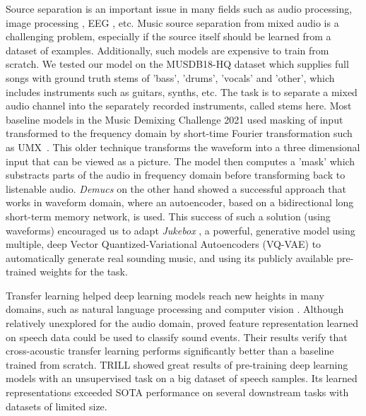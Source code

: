 \documentclass{llncs}
\begin{document}
Source separation is an important issue in many fields such as audio processing, image processing \cite{melnik2021critic}, EEG \cite{melnik2017systems,melnik2017eeg}, etc. Music source separation from mixed audio is a challenging problem, especially if the source itself should be learned from a dataset of examples. Additionally, such models are expensive to train from scratch. We tested our model on the MUSDB18-HQ \cite{MUSDB18HQ} dataset which supplies full songs with ground truth stems of 'bass', 'drums', 'vocals' and 'other', which includes instruments such as guitars, synths, etc. The task is to separate a mixed audio channel into the separately recorded instruments, called stems here. Most baseline models in the Music Demixing Challenge 2021 \cite{musicDemixing} used masking of input transformed to the frequency domain by short-time Fourier transformation such as UMX~\cite{Stoeter2019}. This older technique transforms the waveform into a three dimensional input that can be viewed as a picture. The model then computes a 'mask' which substracts parts of the audio in frequency domain before transforming back to listenable audio. \textit{Demucs} \cite{DBLP:journals/corr/abs-1909-01174} on the other hand showed a successful approach that works in waveform domain, where an autoencoder, based on a bidirectional long short-term memory network, is used. \newline
This success of such a solution (using waveforms) encouraged us to adapt \textit{Jukebox} \cite{dhariwal2020jukebox}, a powerful, generative model using multiple, deep Vector Quantized-Variational Autoencoders (VQ-VAE) \cite{DBLP:journals/corr/abs-1711-00937} to automatically generate real sounding music, and using its publicly available pre-trained weights for the task.



Transfer learning helped deep learning models reach new heights in many domains, such as natural language processing \cite{DBLP:journals/corr/abs-1810-04805,DBLP:journals/corr/abs-1910-10683} and computer vision \cite{HAN201843,https://doi.org/10.1111/mice.12363}. Although relatively unexplored for the audio domain, \cite{7472128} proved feature representation learned on speech data could be used to classify sound events. Their results verify that cross-acoustic transfer learning performs significantly better than a baseline trained from scratch. TRILL \cite{Shor_2020} showed great results of pre-training deep learning models with an unsupervised task on a big dataset of speech samples. Its learned representations exceeded SOTA performance on several downstream tasks with datasets of limited size.
\end{document}
